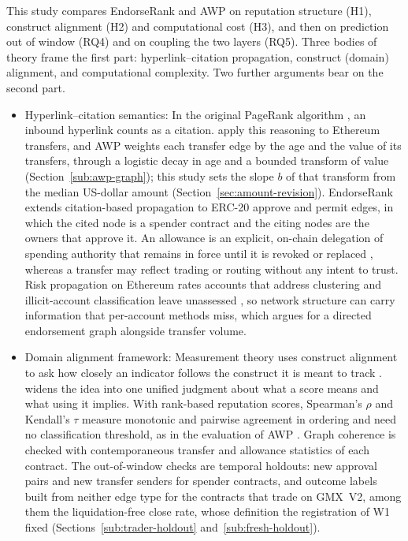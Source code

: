 
This study compares EndorseRank and AWP on reputation structure (H1), construct alignment (H2) and computational cost (H3), and then on prediction out of window (RQ4) and on coupling the two layers (RQ5). Three bodies of theory frame the first part: hyperlink--citation propagation, construct (domain) alignment, and computational complexity. Two further arguments bear on the second part.

\begin{itemize}
\item Hyperlink--citation semantics: In the original PageRank algorithm \parencite{page1999pagerank}, an inbound hyperlink counts as a citation. \textcite{do2023hodgerank} apply this reasoning to Ethereum transfers, and AWP \parencite{do2023awp} weights each transfer edge by the age and the value of its transfers, through a logistic decay in age and a bounded transform of value (Section~\ref{sub:awp-graph}); this study sets the slope $b$ of that transform from the median US-dollar amount (Section~\ref{sec:amount-revision}). EndorseRank extends citation-based propagation to ERC-20 approve and permit edges, in which the cited node is a spender contract and the citing nodes are the owners that approve it. An allowance is an explicit, on-chain delegation of spending authority that remains in force until it is revoked or replaced \parencite{vogelsteller2015erc20}, whereas a transfer may reflect trading or routing without any intent to trust. Risk propagation on Ethereum rates accounts that address clustering and illicit-account classification leave unassessed \parencite{lin2025riskprop}, so network structure can carry information that per-account methods miss, which argues for a directed endorsement graph alongside transfer volume.

\item Domain alignment framework: Measurement theory uses construct alignment to ask how closely an indicator follows the construct it is meant to track \parencite{cronbach1955construct}. \textcite{messick1995validity} widens the idea into one unified judgment about what a score means and what using it implies. With rank-based reputation scores, Spearman's $\rho$ and Kendall's $\tau$ measure monotonic and pairwise agreement in ordering and need no classification threshold, as in the evaluation of AWP \parencite{do2023awp}. Graph coherence is checked with contemporaneous transfer and allowance statistics of each contract. The out-of-window checks are temporal holdouts: new approval pairs and new transfer senders for spender contracts, and outcome labels built from neither edge type for the contracts that trade on GMX~V2, among them the liquidation-free close rate, whose definition the registration of W1 fixed (Sections~\ref{sub:trader-holdout} and~\ref{sub:fresh-holdout}).


\end{itemize}
